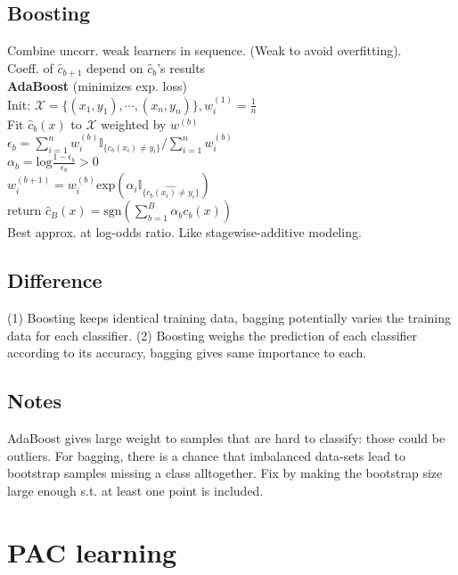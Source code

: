 \subsection*{Boosting}
Combine uncorr. weak learners in sequence. (Weak to avoid overfitting).\\
Coeff. of $\hat{c}_{b+1}$ depend on $\hat{c}_{b}$'s results\\
\textbf{AdaBoost} (minimizes exp. loss)\\
Init: $\mathcal{X}{=}\{(x_1,y_1),\cdots,(x_n,y_n)\}, w_i^{(1)}{=}\frac{1}{n}$\\
Fit  $\hat{c}_b(x)$ to $\mathcal{X}$ weighted by $w^{(b)}$\\
$\epsilon_b=\sum_{i=1}^nw_i^{(b)}\mathbb{I}_{\{c_b(x_i)\not=y_i\}}/\sum_{i=1}^nw_i^{(b)}$\\
$\alpha_b = \mathrm{log}\frac{1-\epsilon_b}{\epsilon_b}>0$\\
$w_i^{(b+1)}=w_i^{(b)}\mathrm{exp}(\alpha_i\mathbb{I}_{\{\hat{c_b(x_i)\not=y_i}\}})$\\
return $\hat{c}_B(x){=}\mathrm{sgn}(\sum_{b{=}1}^B\alpha_bc_b(x))$\\
Best approx. at log-odds ratio. Like stagewise-additive modeling.

\subsection*{Difference}
(1) Boosting keeps identical training data, bagging potentially varies the training data for each classifier. (2) Boosting weighs the prediction of each classifier according to its accuracy, bagging gives same importance to each.
\subsection*{Notes}
AdaBoost gives large weight to samples that are hard to classify: those could be outliers. For bagging, there is a chance that imbalanced data-sets lead to bootstrap samples missing a class alltogether. Fix by making the bootstrap size large enough s.t. at least one point is included.

\section*{PAC learning}

